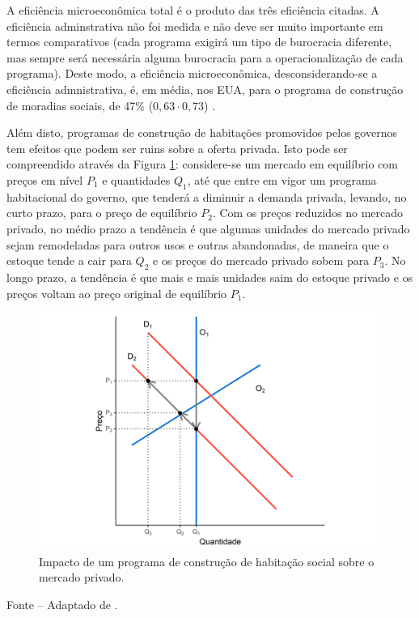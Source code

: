 \documentclass[
	12pt,				%
	oneside,			%
	a4paper,			%
	chapter=TITLE,		%
	section=TITLE,		%
	english,			%
	brazil				%
	]{abntex2}
\newcommand{\bcenter}{\begin{center}}
\newcommand{\ecenter}{\end{center}}
\begin{document}
\begin{refsection}
A eficiência microeconômica total é o produto das três eficiência citadas. A
eficiência adminstrativa não foi medida e não deve ser muito importante em
termos comparativos (cada programa exigirá um tipo de burocracia diferente, mas
sempre será necessária alguma burocracia para a operacionalização de cada
programa). Deste modo, a eficiência microeconômica, desconsiderando-se a
eficiência admnistrativa, é, em média, nos \gls{EUA}, para o programa de
construção de moradias sociais, de 47\% (\(0,63 \cdot 0,73\))
\autocite{malpezzi_affordable_2018_1}.

Além disto, programas de construção de habitações promovidos pelos governos
tem efeitos que podem ser ruins sobre a oferta privada. Isto pode ser
compreendido através da Figura \ref{fig:cohab}: considere-se um mercado em
equilíbrio com preços em nível \(P_1\) e quantidades \(Q_1\), até que entre em vigor
um programa habitacional do governo, que tenderá a diminuir a demanda privada,
levando, no curto prazo, para o preço de equilíbrio \(P_2\). Com os preços
reduzidos no mercado privado, no médio prazo a tendência é que algumas unidades
do mercado privado sejam remodeladas para outros usos e outras abandonadas, de
maneira que o estoque tende a cair para \(Q_2\) e os preços do mercado privado
sobem para \(P_3\). No longo prazo, a tendência é que mais e mais unidades saim
do estoque privado e os preços voltam ao preço original de equilíbrio \(P_1\).
\begin{figure}[H]

{\centering \includegraphics[width=0.7\linewidth]{images/cohab-1} 

}

\caption{Impacto de um programa de construção de habitação social sobre o mercado privado.}\label{fig:cohab}
\end{figure}
\bcenter

\small Fonte -- Adaptado de \textcite{malpezzi_affordable_2018_2}.
\ecenter


\end{refsection}
\end{document}
